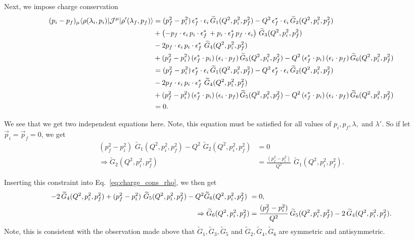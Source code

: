  Next, we impose charge conservation
\begin{align}
(p_i-p_f)_\mu\langle\rho(\lambda_i,p_i)|{\mathcal{J}}^{\mu}|\rho'(\lambda_f,p_f)\rangle
&=
(p_f^2-p_i^2) \,\epsilon_f^*\cdot \epsilon_i\, \widetilde{G}_1(Q^2,p_i^2,p_f^2)
-Q^2 \,\epsilon_f^*\cdot \epsilon_i\,\widetilde{G}_2(Q^2,p_i^2,p_f^2)
\nonumber\\&
+
\left(-p_f\cdot\epsilon_i\, p_i\cdot \epsilon_f^*\,+p_i\cdot\epsilon_f^{*}\, p_f\cdot \epsilon_i\right)
\,\widetilde{G}_3(Q^2,p_i^2,p_f^2)
\nonumber\\&
-2p_f\cdot\epsilon_i\, p_i\cdot \epsilon_f^*\,
\,\widetilde{G}_4(Q^2,p_i^2,p_f^2)
\nonumber\\
&+(p_f^2-p_i^2) \,(\epsilon_f^*\cdot p_i)\,(\epsilon_i\cdot p_f)\,\widetilde{G}_5(Q^2,p_i^2,p_f^2)
-Q^2 \,(\epsilon_f^*\cdot p_i)\,(\epsilon_i\cdot p_f)\,\widetilde{G}_6(Q^2,p_i^2,p_f^2)
\nonumber\\
&=
(p_f^2-p_i^2) \,\epsilon_f^*\cdot \epsilon_i\, \widetilde{G}_1(Q^2,p_i^2,p_f^2)
-Q^2 \,\epsilon_f^*\cdot \epsilon_i\,\widetilde{G}_2(Q^2,p_i^2,p_f^2)
\nonumber\\
&-2p_f\cdot\epsilon_i\, p_i\cdot \epsilon_f^*\,
\,\widetilde{G}_4(Q^2,p_i^2,p_f^2)
\nonumber\\&
+(p_f^2-p_i^2) \,(\epsilon_f^*\cdot p_i)\,(\epsilon_i\cdot p_f)\,\widetilde{G}_5(Q^2,p_i^2,p_f^2)
-Q^2 \,(\epsilon_f^*\cdot p_i)\,(\epsilon_i\cdot p_f)\,\widetilde{G}_6(Q^2,p_i^2,p_f^2)
\nonumber\\
&=0.
\label{eq:charge_cons_rho}
\end{align}

We see that we get two independent equations here. Note, this equation must be satisfied for all values of $p_i,p_f,\lambda,$ and $\lambda'$. So if let $\vec{p}_i=\vec{p}_f=0$, we get 
\begin{align}
(p_f^2-p_i^2) \,\, \widetilde{G}_1(Q^2,p_i^2,p_f^2)
-Q^2 \,\,\widetilde{G}_2(Q^2,p_i^2,p_f^2)&=0
\\
\Rightarrow
\widetilde{G}_2(Q^2,p_i^2,p_f^2)&=
\frac{(p_f^2-p_i^2)}{Q^2} \,\, \widetilde{G}_1(Q^2,p_i^2,p_f^2).
\end{align}

Inserting this constraint into Eq.~\ref{eq:charge_cons_rho}, we then get
\begin{align}
-2
\,\widetilde{G}_4(Q^2,p_i^2,p_f^2)
+(p_f^2-p_i^2) \,\,\widetilde{G}_5(Q^2,p_i^2,p_f^2)
-Q^2\widetilde{G}_6(Q^2,p_i^2,p_f^2) \,\,
&=0,
\nonumber\\
\Rightarrow
\widetilde{G}_6(Q^2,p_i^2,p_f^2)&=\frac{(p_f^2-p_i^2)}{Q^2} \,\widetilde{G}_5(Q^2,p_i^2,p_f^2)-
2
\,\widetilde{G}_4(Q^2,p_i^2,p_f^2).
\end{align}
Note, this is consistent with the observation made above that $\widetilde{G}_1,\widetilde{G}_3,\widetilde{G}_5$ and $\widetilde{G}_2,\widetilde{G}_4,\widetilde{G}_6$ are symmetric and antisymmetric.

